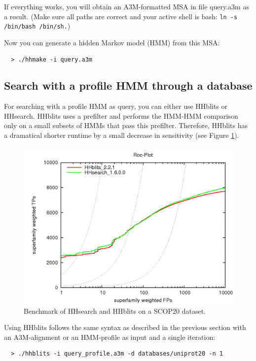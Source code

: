 \documentclass[11pt,a4paper]{article}
\begin{document}
If everything works, you will obtain an A3M-formatted MSA in file query.a3m 
as a result. (Make sure all paths are correct and your active shell is bash: 
\verb`ln -s /bin/bash /bin/sh.`)

Now you can generate a hidden Markov model (HMM) from this MSA:
\begin{verbatim}
  > ./hhmake -i query.a3m
\end{verbatim}


\subsection{Search with a profile HMM through a database}

For searching with a profile HMM as query, you can either use HHblits or HHsearch. HHblits
uses a prefilter and performs the HMM-HMM comparison only on a small subsets of HMMs that pass
this prefilter. Therefore, HHblits has a dramatical shorter runtime by a small decrease in 
sensitivity (see Figure \ref{fig:hhsearch_hhblits_bench}). 

\begin{figure}[t]
\includegraphics[width=\textwidth]{hhblits-hhsearch.png}
\caption{Benchmark of HHsearch and HHblits on a SCOP20 dataset.}
\label{fig:hhsearch_hhblits_bench}
\end{figure}

Using HHblits follows the same syntax as described in the previous section with an A3M-alignment
or an HMM-profile as input and a single iteration:

\begin{verbatim}
  > ./hhblits -i query_profile.a3m -d databases/uniprot20 -n 1
\end{verbatim}
\end{document}
